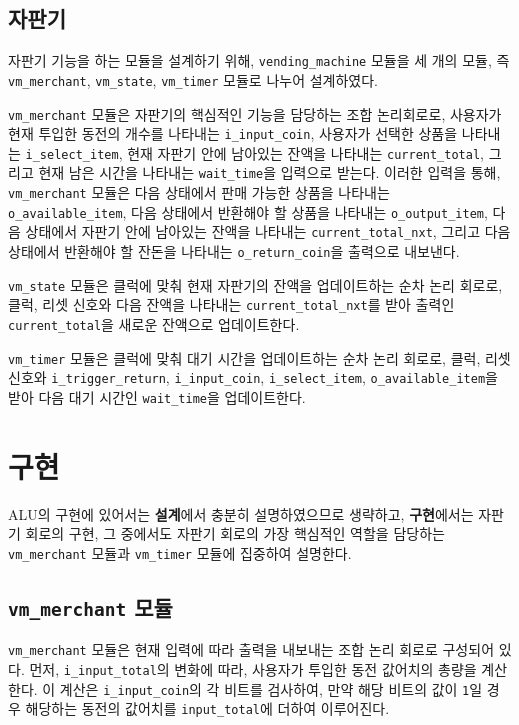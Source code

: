 \documentclass[openright, a4paper]{article}
\newcommand{\code}[1]{\texttt{#1}}
\begin{document}
\subsection{자판기}
자판기 기능을 하는 모듈을 설계하기 위해, \code{vending_machine} 모듈을 세 개의 모듈, 즉 \code{vm_merchant},
\code{vm_state}, \code{vm_timer} 모듈로 나누어 설계하였다.

\code{vm_merchant} 모듈은 자판기의 핵심적인 기능을 담당하는 조합 논리회로로, 사용자가 현재 투입한
동전의 개수를 나타내는 \code{i_input_coin}, 사용자가 선택한 상품을 나타내는 \code{i_select_item}, 
현재 자판기 안에 남아있는 잔액을 나타내는 \code{current_total}, 그리고 현재 남은 시간을 나타내는 
\code{wait_time}을 입력으로 받는다. 이러한 입력을 통해, \code{vm_merchant} 모듈은
다음 상태에서 판매 가능한 상품을 나타내는 \code{o_available_item}, 다음 상태에서 반환해야 할 상품을 
나타내는 \code{o_output_item}, 다음 상태에서 자판기 안에 남아있는 잔액을 나타내는 
\code{current_total_nxt}, 그리고 다음 상태에서 반환해야 할 잔돈을 나타내는 \code{o_return_coin}을
출력으로 내보낸다.

\code{vm_state} 모듈은 클럭에 맞춰 현재 자판기의 잔액을 업데이트하는 순차 논리 회로로, 클럭, 리셋 신호와
다음 잔액을 나타내는 \code{current_total_nxt}를 받아 출력인 \code{current_total}을 새로운 잔액으로 
업데이트한다.

\code{vm_timer} 모듈은 클럭에 맞춰 대기 시간을 업데이트하는 순차 논리 회로로, 클럭, 리셋 신호와 \code{i_trigger_return}, 
\code{i_input_coin}, \code{i_select_item}, \code{o_available_item}을 받아 다음 대기 시간인 \code{wait_time}을 업데이트한다.

\section{구현}
ALU의 구현에 있어서는 \textbf{설계}에서 충분히 설명하였으므로 생략하고, \textbf{구현}에서는 자판기
회로의 구현, 그 중에서도 자판기 회로의 가장 핵심적인 역할을 담당하는 \code{vm_merchant} 모듈과 \code{vm_timer} 모듈에 집중하여
설명한다.

\subsection{\code{vm_merchant} 모듈}
\code{vm_merchant} 모듈은 현재 입력에 따라 출력을 내보내는 조합 논리 회로로 구성되어 있다. 먼저, \code{i_input_total}의
변화에 따라, 사용자가 투입한 동전 값어치의 총량을 계산한다. 이 계산은 \code{i_input_coin}의 각 비트를 검사하여,
만약 해당 비트의 값이 \code{1}일 경우 해당하는 동전의 값어치를 \code{input_total}에 더하여 이루어진다.
\end{document}
